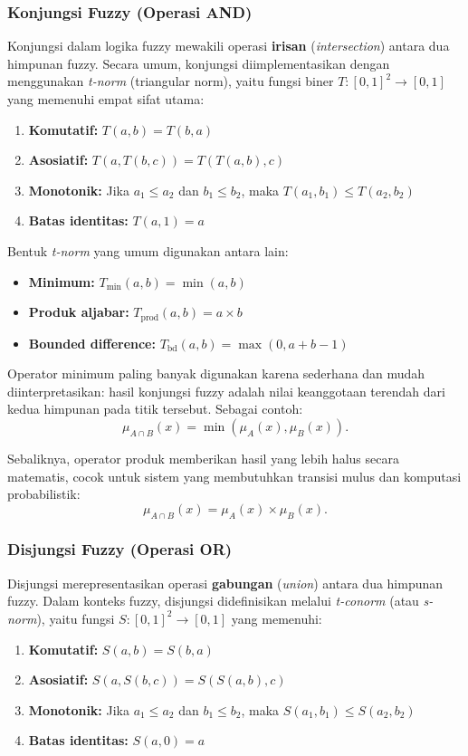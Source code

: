 \documentclass[12pt,a4paper]{article}
\theoremstyle{remark}
\begin{document}
\subsubsection{Konjungsi Fuzzy (Operasi AND)}
Konjungsi dalam logika fuzzy mewakili operasi \textbf{irisan} (\textit{intersection}) antara dua himpunan fuzzy. Secara umum, konjungsi diimplementasikan dengan menggunakan \textit{t-norm} (triangular norm), yaitu fungsi biner \(T: [0,1]^2 \to [0,1]\) yang memenuhi empat sifat utama:
\begin{enumerate}
    \item \textbf{Komutatif:} \(T(a,b) = T(b,a)\)
    \item \textbf{Asosiatif:} \(T(a, T(b,c)) = T(T(a,b), c)\)
    \item \textbf{Monotonik:} Jika \(a_1 \leq a_2\) dan \(b_1 \leq b_2\), maka \(T(a_1,b_1) \leq T(a_2,b_2)\)
    \item \textbf{Batas identitas:} \(T(a,1) = a\)
\end{enumerate}

Bentuk \textit{t-norm} yang umum digunakan antara lain:
\begin{itemize}
    \item \textbf{Minimum:} \(T_{\min}(a,b) = \min(a,b)\)
    \item \textbf{Produk aljabar:} \(T_{\text{prod}}(a,b) = a \times b\)
    \item \textbf{Bounded difference:} \(T_{\text{bd}}(a,b) = \max(0, a+b-1)\)
\end{itemize}

Operator minimum paling banyak digunakan karena sederhana dan mudah diinterpretasikan: hasil konjungsi fuzzy adalah nilai keanggotaan terendah dari kedua himpunan pada titik tersebut.
Sebagai contoh:
\begin{equation}
    \label{eq:konjungsi_minimum}
    \mu_{A \cap B}(x) = \min(\mu_A(x), \mu_B(x)).
\end{equation}

Sebaliknya, operator produk memberikan hasil yang lebih halus secara matematis, cocok untuk sistem yang membutuhkan transisi mulus dan komputasi probabilistik:
\[
    \mu_{A \cap B}(x) = \mu_A(x) \times \mu_B(x).
\]

\subsubsection{Disjungsi Fuzzy (Operasi OR)}
Disjungsi merepresentasikan operasi \textbf{gabungan} (\textit{union}) antara dua himpunan fuzzy. Dalam konteks fuzzy, disjungsi didefinisikan melalui \textit{t-conorm} (atau \textit{s-norm}), yaitu fungsi \(S: [0,1]^2 \to [0,1]\) yang memenuhi:
\begin{enumerate}
    \item \textbf{Komutatif:} \(S(a,b) = S(b,a)\)
    \item \textbf{Asosiatif:} \(S(a, S(b,c)) = S(S(a,b), c)\)
    \item \textbf{Monotonik:} Jika \(a_1 \leq a_2\) dan \(b_1 \leq b_2\), maka \(S(a_1,b_1) \leq S(a_2,b_2)\)
    \item \textbf{Batas identitas:} \(S(a,0) = a\)
\end{enumerate}
\end{document}
